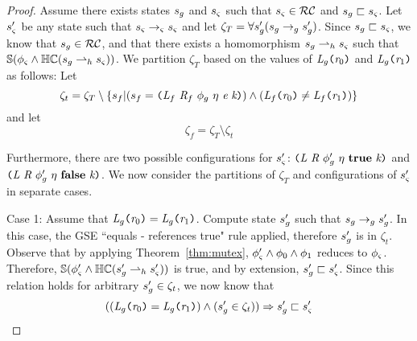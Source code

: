 \begin{proof}
Assume there exists states $s_{g}$ and $s_{\varsigma}$ such that $s_{\varsigma} \in \mathcal{RC}$ and $s_{g} \sqsubset s_{\varsigma}$. Let $s_{\varsigma}^\prime$ be any state such that $s_{\varsigma} \rightarrow_{\varsigma} s_{\varsigma}$ and let $\zeta_T = \forall s_{g}^\prime ( s_{g} \rightarrow_{g} s_{g}^\prime )$. Since $s_{g} \sqsubset s_{\varsigma}$, we know that $s_{g} \in \mathcal{RC}$, and that there exists a homomorphism $s_{g} \rightharpoonup_{h} s_{\varsigma}$ such that $\mathbb{S}( \phi_{\varsigma} \wedge \mathbb{HC}(s_{g} \rightharpoonup_{h} s_{\varsigma}) ) $. We partition $\zeta_T$ based on the values of $\emph{L}_{g} \texttt{(} \emph{r}_0\texttt{)}$ and $\emph{L}_{g} \texttt{(} \emph{r}_1 \texttt{)}$ as follows: Let
$$\zeta_t = \zeta_T \setminus \{ s_f | (s_f= \texttt{(} \emph{L}_f\ \emph{R}_f\ \phi_{g}\ \eta\ \emph{e}\ \emph{k}\texttt{)}) \wedge (\emph{L}_f \texttt{(} \emph{r}_0\texttt{)} \neq \emph{L}_f \texttt{(} \emph{r}_1 \texttt{)} ) \}$$
and let
$$\zeta_f = \zeta_T \setminus \zeta_t$$ 

Furthermore, there are two possible configurations for $s_{\varsigma}^\prime$: $\lp \cfgnt{L}\ \cfgnt{R}\ \phi_g^\prime\ \eta\ \cfgt{true}\ \cfgnt{k}\rp $ and $\lp \cfgnt{L}\ \cfgnt{R}\ \phi_g^\prime\ \eta\ \cfgt{false}\ \cfgnt{k}\rp $. We now consider the partitions of $\zeta_T$ and configurations of $s_{\varsigma}^\prime$ in separate cases.

Case 1: Assume that $\emph{L}_{g} \texttt{(} \emph{r}_0\texttt{)} = \emph{L}_{g} \texttt{(} \emph{r}_1 \texttt{)}$. 
Compute state $s_{g}^\prime$ such that $s_{g} \rightarrow_{g} s_{g}^\prime$. In this case, the GSE ``equals - references true" rule applied, therefore $s_{g}^\prime$ is in $\zeta_t$. Observe that by applying Theorem~\ref{thm:mutex}, $\phi_{\varsigma}^\prime \wedge \phi_0 \wedge \phi_1$ reduces to $\phi_{\varsigma}$. Therefore, $\mathbb{S}( \phi_{\varsigma}^\prime \wedge \mathbb{HC}(s_{g}^\prime \rightharpoonup_{h} s_{\varsigma}^\prime) ) $ is true, and by extension, $s_{g}^\prime \sqsubset s_{\varsigma}^\prime$. Since this relation holds for arbitrary $s_{g}^\prime \in \zeta_t$, we now know that 
\begin{equation}
\label{eqn:RCForwardsTrue}
((\emph{L}_{g} \texttt{(} \emph{r}_0\texttt{)} = \emph{L}_{g} \texttt{(} \emph{r}_1 \texttt{)}) \wedge (s_{g}^\prime \in \zeta_t)) \Rightarrow s_{g}^\prime \sqsubset s_{\varsigma}^\prime
\end{equation}


\end{proof}
